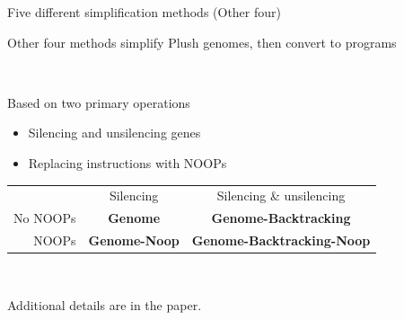 \documentclass{beamer}
\begin{document}
\begin{frame}{Five different simplification methods (Other four)}

Other four methods simplify Plush genomes, then convert to programs

~

Based on two primary operations
\begin{itemize}
	\item Silencing and unsilencing genes
	\item Replacing instructions with NOOPs
\end{itemize}

\begin{center}
\begin{tabular}{rcc} %
	&  Silencing & Silencing \& unsilencing \\ 
	No NOOPs & \textbf{Genome} & \textbf{Genome-Backtracking} \\ 
	NOOPs & \textbf{Genome-Noop} & \textbf{Genome-Back\-tracking-Noop } \\ 
\end{tabular} 
\end{center}


~

Additional details are in the paper.

\end{frame}
\end{document}
